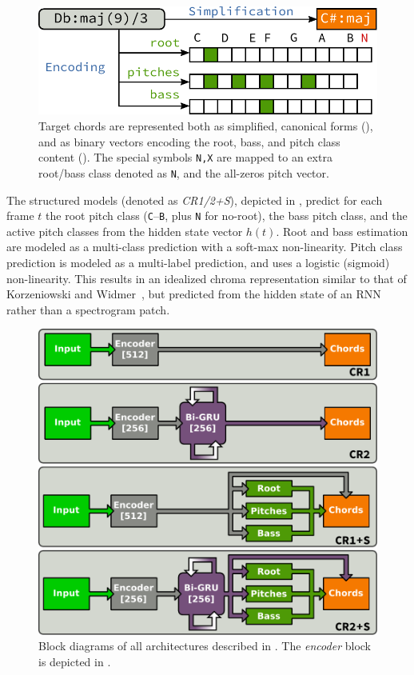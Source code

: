 \documentclass{article}
\begin{document}
\begin{figure}[t]
    \centering
    \includegraphics[width=0.9\columnwidth]{encoding}
    \caption{Target chords are represented both as simplified, canonical forms (), and as binary vectors encoding the root, bass, and pitch class content ().
    The special symbols \texttt{N,X} are mapped to an extra root/bass class denoted as \texttt{N}, and the all-zeros pitch vector.\label{fig:encoding}}
\end{figure}

The structured models (denoted as \emph{CR1/2+S}), depicted in , predict for each frame $t$ the root pitch class (\texttt{C}--\texttt{B}, plus \texttt{N} for no-root), the bass pitch class, and the active pitch classes from the hidden state vector $h(t)$.
Root and bass estimation are modeled as a multi-class prediction with a soft-max non-linearity.
Pitch class prediction is modeled as a multi-label prediction, and uses a logistic (sigmoid) non-linearity.
This results in an idealized chroma representation similar to that of Korzeniowski and Widmer~\cite{korzeniowski2016feature}, but predicted from the hidden state of an RNN rather than a spectrogram patch.

\begin{figure}[t]
    \centering
    \includegraphics[width=\columnwidth]{architectures}
    \caption{Block diagrams of all architectures described in .
    The \emph{encoder} block is depicted in .\label{fig:architectures}}
\end{figure}
\end{document}
